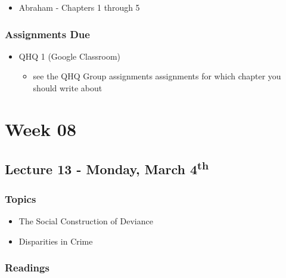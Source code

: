 \documentclass[]{book}
\providecommand{\tightlist}{%
  \setlength{\itemsep}{0pt}\setlength{\parskip}{0pt}}
\begin{document}
\begin{itemize}
\tightlist
\item
  Abraham - Chapters 1 through 5
\end{itemize}

\hypertarget{assignments-due-3}{%
\subsubsection*{Assignments Due}\label{assignments-due-3}}

\begin{itemize}
\tightlist
\item
  QHQ 1 (Google Classroom)

  \begin{itemize}
  \tightlist
  \item
    see the QHQ Group assignments assignments for which chapter you should write about
  \end{itemize}
\end{itemize}

\hypertarget{week-08}{%
\section*{Week 08}\label{week-08}}

\hypertarget{lecture-13---monday-march-4th}{%
\subsection*{\texorpdfstring{Lecture 13 - Monday, March 4\textsuperscript{th}}{Lecture 13 - Monday, March 4th}}\label{lecture-13---monday-march-4th}}

\hypertarget{topics-14}{%
\subsubsection*{Topics}\label{topics-14}}

\begin{itemize}
\tightlist
\item
  The Social Construction of Deviance
\item
  Disparities in Crime
\end{itemize}

\hypertarget{readings-13}{%
\subsubsection*{Readings}\label{readings-13}}
\end{document}
